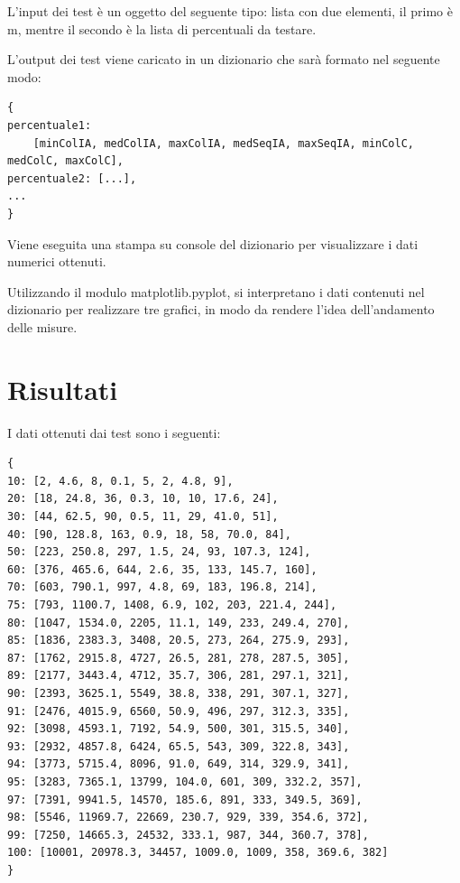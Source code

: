 \documentclass[]{article}
\begin{document}
L'input dei test è un oggetto del seguente tipo: lista con due elementi, il primo è m, mentre il secondo è la lista di percentuali da testare.

L'output dei test viene caricato in un dizionario che sarà formato nel seguente modo:
\begin{verbatim}
{
percentuale1:
    [minColIA, medColIA, maxColIA, medSeqIA, maxSeqIA, minColC, medColC, maxColC],
percentuale2: [...],
...
}
\end{verbatim}
Viene eseguita una stampa su console del dizionario per visualizzare i dati numerici ottenuti.

Utilizzando il modulo matplotlib.pyplot, si interpretano i dati contenuti nel dizionario per realizzare tre grafici, in modo da rendere l'idea dell'andamento delle misure.

\section{Risultati}
I dati ottenuti dai test sono i seguenti:
\begin{verbatim}
{
10: [2, 4.6, 8, 0.1, 5, 2, 4.8, 9],
20: [18, 24.8, 36, 0.3, 10, 10, 17.6, 24],
30: [44, 62.5, 90, 0.5, 11, 29, 41.0, 51],
40: [90, 128.8, 163, 0.9, 18, 58, 70.0, 84],
50: [223, 250.8, 297, 1.5, 24, 93, 107.3, 124],
60: [376, 465.6, 644, 2.6, 35, 133, 145.7, 160],
70: [603, 790.1, 997, 4.8, 69, 183, 196.8, 214],
75: [793, 1100.7, 1408, 6.9, 102, 203, 221.4, 244],
80: [1047, 1534.0, 2205, 11.1, 149, 233, 249.4, 270],
85: [1836, 2383.3, 3408, 20.5, 273, 264, 275.9, 293],
87: [1762, 2915.8, 4727, 26.5, 281, 278, 287.5, 305],
89: [2177, 3443.4, 4712, 35.7, 306, 281, 297.1, 321],
90: [2393, 3625.1, 5549, 38.8, 338, 291, 307.1, 327],
91: [2476, 4015.9, 6560, 50.9, 496, 297, 312.3, 335],
92: [3098, 4593.1, 7192, 54.9, 500, 301, 315.5, 340],
93: [2932, 4857.8, 6424, 65.5, 543, 309, 322.8, 343],
94: [3773, 5715.4, 8096, 91.0, 649, 314, 329.9, 341],
95: [3283, 7365.1, 13799, 104.0, 601, 309, 332.2, 357],
97: [7391, 9941.5, 14570, 185.6, 891, 333, 349.5, 369],
98: [5546, 11969.7, 22669, 230.7, 929, 339, 354.6, 372],
99: [7250, 14665.3, 24532, 333.1, 987, 344, 360.7, 378],
100: [10001, 20978.3, 34457, 1009.0, 1009, 358, 369.6, 382]
}
\end{verbatim}
\end{document}
